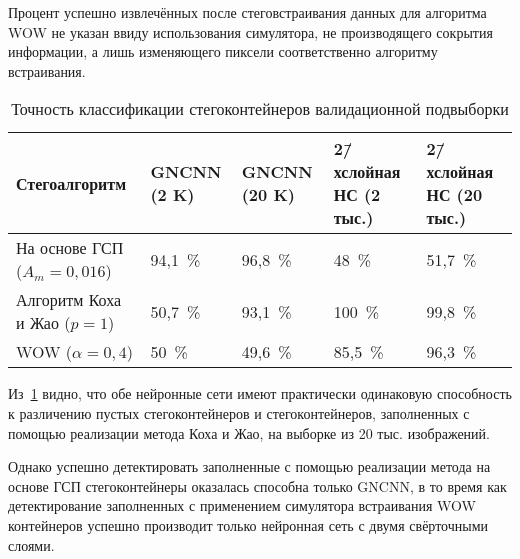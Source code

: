 Процент успешно извлечённых после стеговстраивания данных для алгоритма WOW не указан ввиду использования симулятора, не производящего сокрытия информации, а лишь изменяющего пиксели соответственно алгоритму встраивания.

\begin{table}[h!]
\centering
    \begin{tabular}{| l | p{2cm} | p{2cm} | p{2cm} | p{2cm} |}
    \hline
    Стегоалгоритм & GNCNN (2 K) & GNCNN (20 K) & 2\=/хслойная НС (2 тыс.) & 2\=/хслойная НС (20 тыс.) \\ \hline
    На основе ГСП ($ A_m = 0,016 $) & 94,1~\% & 96,8~\% & 48~\% & 51,7~\% \\ \hline
    Алгоритм Коха и Жао ($ p = 1 $) & 50,7~\% & 93,1~\% & 100~\% & 99,8~\% \\ \hline
    WOW ($ \alpha = 0,4 $) & 50~\% & 49,6~\% & 85,5~\% & 96,3~\% \\ \hline
    \end{tabular}
\caption{Точность классификации стегоконтейнеров валидационной подвыборки}
\label{table:2}
\end{table}

Из~\ref{table:2} видно, что обе нейронные сети имеют практически одинаковую способность к различению пустых стегоконтейнеров и стегоконтейнеров, заполненных с помощью реализации метода Коха и Жао, на выборке из 20 тыс. изображений.

Однако успешно детектировать заполненные с помощью реализации метода на основе ГСП стегоконтейнеры оказалась способна только GNCNN, в то время как детектирование заполненных с применением симулятора встраивания WOW контейнеров успешно производит только нейронная сеть с двумя свёрточными слоями.

\clearpage
